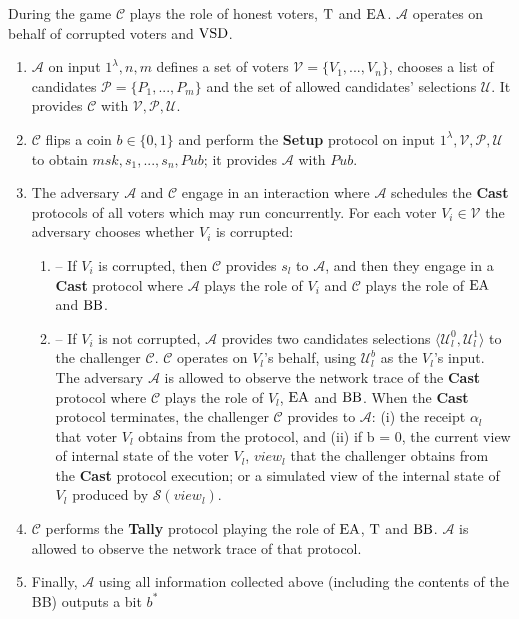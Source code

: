 \begin{definition}
 During the game $\mathcal{C}$ plays the role of honest voters, $\operatorname{T}$ and $\operatorname{EA}$. $\mathcal{A}$ operates on behalf of corrupted voters and $\operatorname{VSD}$. 
\begin{enumerate}
\item $\mathcal{A}$ on input $1^{\lambda},n,m$ defines a set of voters  $\mathcal{V} = \{V_1,...,V_n\}$, chooses a list of candidates  $\mathcal{P} = \{P_1,...,P_m\}$ and the set of allowed candidates' selections $\mathcal{U}$.  It provides $\mathcal{C}$ with $\mathcal{V}, \mathcal{P}, \mathcal{U}$.
\item $\mathcal{C}$ flips a coin $b\in \{0,1\}$ and perform the \textbf{Setup} protocol on input $1^{\lambda},\mathcal{V}, \mathcal{P}, \mathcal{U}$ to obtain $msk,s_1,...,s_n, Pub$; it provides  $\mathcal{A}$ with $Pub$. 
\item The adversary $\mathcal{A}$  and $\mathcal{C}$ engage in an interaction where $\mathcal{A}$ schedules the \textbf{Cast} protocols of all voters which may run concurrently. For each voter  $V_i \in \mathcal{V}$ the adversary chooses whether $V_i$ is corrupted:
\begin{enumerate}
\item[] -- If $V_i$ is corrupted, then $\mathcal{C}$ provides $s_l$ to $\mathcal{A}$, and then they engage in a  \textbf{Cast} protocol where $\mathcal{A}$ plays the role of $V_i$ and  $\mathcal{C}$ plays the role of $\operatorname{EA}$ and $\operatorname{BB}$.
\item[] --  If $V_i$ is not corrupted, $\mathcal{A}$ provides two candidates selections $\langle \mathcal{U}^0_l , \mathcal{U}^1_l \rangle$ to the challenger $\mathcal{C}$. $\mathcal{C}$ operates on $V_l$'s behalf, using  $\mathcal{U}^b_l$ as the $V_l$'s input. The adversary  $\mathcal{A}$ is allowed to observe the network trace of the \textbf{Cast} protocol where  $\mathcal{C}$ plays the role of $V_l$, $\operatorname{EA}$ and $\operatorname{BB}$. When the  \textbf{Cast} protocol terminates, the challenger  $\mathcal{C}$ provides to $\mathcal{A}$: (i) the receipt $\alpha_l$ that voter $V_l$ obtains from the protocol, and (ii) if b = 0, the current view of internal state of the voter $V_l$, $view_l$ that the challenger obtains from the \textbf{Cast} protocol execution; or  a simulated view of the internal state of $V_l$ produced by $\mathcal{S}(view_l)$.
\end{enumerate}
\item $\mathcal{C}$ performs the  \textbf{Tally} protocol playing the role of $\operatorname{EA}$, $\operatorname{T}$  and $\operatorname{BB}$. $\mathcal{A}$ is allowed to observe the network trace of that protocol. 
\item Finally, $\mathcal{A}$ using all information collected above (including the contents of the BB) outputs a bit $b^*$

\end{enumerate}
\end{definition}
